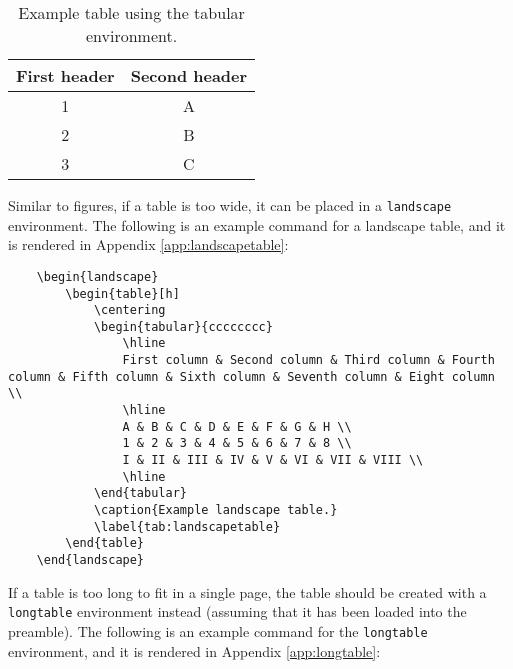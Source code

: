 \documentclass{umalayathesis}
\begin{document}
\begin{table}[h]
    \centering
    \caption{Example table using the tabular environment.}
    \label{tab:table}
    \begin{tabular}{cc}
        \hline
        First header & Second header \\
        \hline
        1 & A \\
        2 & B \\
        3 & C \\
        \hline
    \end{tabular}
\end{table}

Similar to figures, if a table is too wide, it can be placed in a \texttt{landscape} environment. The following is an example command for a landscape table, and it is rendered in Appendix \ref{app:landscapetable}:

\begin{verbatim}
    \begin{landscape}
        \begin{table}[h]
            \centering
            \begin{tabular}{cccccccc}
                \hline
                First column & Second column & Third column & Fourth column & Fifth column & Sixth column & Seventh column & Eight column \\
                \hline
                A & B & C & D & E & F & G & H \\
                1 & 2 & 3 & 4 & 5 & 6 & 7 & 8 \\
                I & II & III & IV & V & VI & VII & VIII \\
                \hline
            \end{tabular}
            \caption{Example landscape table.}
            \label{tab:landscapetable}
        \end{table}
    \end{landscape}
\end{verbatim}

If a table is too long to fit in a single page, the table should be created with a \texttt{longtable} environment instead (assuming that it has been loaded into the preamble). The following is an example command for the \texttt{longtable} environment, and it is rendered in Appendix \ref{app:longtable}:
\end{document}
